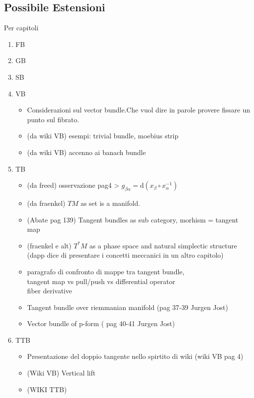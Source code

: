 \documentclass[a4paper,12pt]{scrartcl}    %
\begin{document}
\subsection{Possibile Estensioni}
Per capitoli
\begin{enumerate}
\item FB

\item GB

\item SB

\item VB
	\begin{itemize}
		 \item Considerazioni sul vector bundle.Che vuol dire in parole provere fissare un punto sul fibrato.
		 \item (da wiki VB) esempi: trivial bundle, moebius strip
		 \item (da wiki VB) accenno ai banach bundle
	\end{itemize}

\item TB
	\begin{itemize}
		 \item (da freed) osservazione pag4 > $g_{\beta \alpha} = \textrm{d} ( x_\beta \circ x_\alpha^{-1})$
		 \item (da fraenkel) $TM$ as set is a manifold.
		 \item (Abate pag 139) Tangent bundles as sub category, morhism = tangent map
		 \item (fraenkel e alt) $T^*M$ as a phase space and natural simplectic structure (dapp dice di presentare i concetti meccanici in un altro capitolo)
		 \item paragrafo di confronto di mappe tra tangent bundle,\\ tangent map vs pull/push vs differential operator \\ fiber derivative 
		 \item Tangent bundle over riemmanian manifold (pag 37-39 Jurgen Jost)
		 \item Vector bundle of p-form ( pag 40-41 Jurgen Jost)
	\end{itemize}

\item TTB
	\begin{itemize}
		 \item Presentazione del doppio tangente nello spirtito di wiki (wiki VB pag 4)
		 \item (Wiki VB) Vertical lift
		 \item (WIKI TTB)
	\end{itemize}
\end{enumerate}
\end{document}
